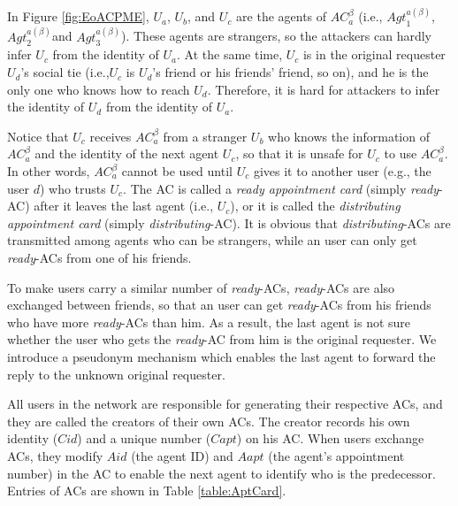 In Figure \ref{fig:EoACPME}, $U_a$, $U_b$, and $U_c$ are the agents of ${AC}^{\beta }_a$ (i.e., ${Agt}^{a\left(\beta \right)}_1$, ${Agt}^{a\left(\beta \right)}_2$and ${Agt}^{a\left(\beta \right)}_3$). These agents are strangers, so the attackers can hardly infer $U_c$ from the identity of $U_a$. At the same time, $U_c$ is in the original requester $U_d$'s social tie (i.e.,$U_c$ is $U_d$'s friend or his friends' friend, so on), and he is the only one who knows how to reach $U_d$. Therefore, it is hard for attackers to infer the identity of $U_d$ from the identity of $U_a$.

Notice that $U_c$ receives ${AC}^{\beta }_a$ from a stranger $U_b$ who knows the information of ${AC}^{\beta }_a$ and the identity of the next agent $U_c$, so that it is unsafe for $U_c$ to use ${AC}^{\beta }_a$. In other words, ${AC}^{\beta }_a$ cannot be used until $U_c$ gives it to another user (e.g., the user $d$) who trusts $U_c$. The AC is called a \textit{ready appointment card} (simply \textit{ready}-AC) after it leaves the last agent (i.e., $U_c$), or it is called the \textit{distributing appointment card} (simply \textit{distributing}-AC). It is obvious that \textit{distributing}-ACs are transmitted among agents who can be strangers, while an user can only get \textit{ready}-ACs from one of his friends.

To make users carry a similar number of \textit{ready}-ACs, \textit{ready}-ACs are also exchanged between friends, so that an user can get \textit{ready}-ACs from his friends who have more \textit{ready}-ACs than him. As a result, the last agent is not sure whether the user who gets the \textit{ready}-AC from him is the original requester. We introduce a pseudonym mechanism which enables the last agent to forward the reply to the unknown original requester. 

All users in the network are responsible for generating their respective ACs, and they are called the creators of their own ACs. The creator records his own identity ($Cid$) and a unique number ($Capt$) on his AC. When users exchange ACs, they modify $Aid$ (the agent ID) and ${Aapt}$ (the agent's appointment number) in the AC to enable the next agent to identify who is the predecessor. Entries of ACs are shown in Table \ref{table:AptCard}.


